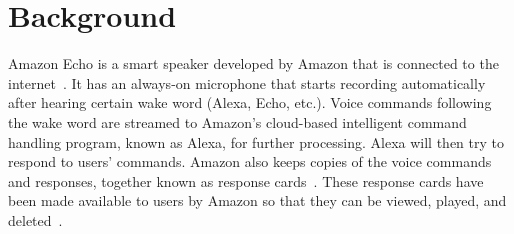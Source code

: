 \section{Background}
Amazon Echo is a smart speaker developed by Amazon that is connected to the internet~\cite{wikipedia_2019}. It has an always-on microphone that starts recording automatically after hearing certain wake word (Alexa, Echo, etc.). Voice commands following the wake word are streamed to Amazon's cloud-based intelligent command handling program, known as Alexa, for further processing. Alexa will then try to respond to users' commands. Amazon also keeps copies of the voice commands and responses, together known as response cards~\cite{ford2019alexa}. These response cards have been made available to users by Amazon so that they can be viewed, played, and deleted~\cite{amazon_2010}. 
